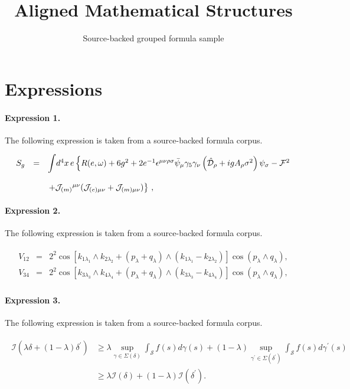 \documentclass[11pt]{article}
\title{Aligned Mathematical Structures}
\author{Source-backed grouped formula sample}
\date{}
\begin{document}
\maketitle
\section{Expressions}
\paragraph{Expression 1.} The following expression is taken from a source-backed formula corpus.

\begin{align*}\begin{array}{rcl}S_{g} & = & {\displaystyle\int} d^{4}x\, e \left\{ R(e,\omega) +6g^{2}+2 e^{-1}\epsilon^{\mu\nu\rho\sigma}\bar{\psi}_{\mu}\gamma_{5}\gamma_{\nu}\left(\hat{\cal D}_{\rho}+ig A_{\rho}\sigma^{2}\right)\psi_{\sigma}-{\cal F}^{2} \right.\\& & \\& & \left. +{\cal J}_{(m)}{}^{\mu\nu}({\cal J}_{(e) \mu\nu} +{\cal J}_{(m) \mu\nu}) \right\}\, ,\end{array}\end{align*}

\paragraph{Expression 2.} The following expression is taken from a source-backed formula corpus.

\begin{align*}\begin{array}{rcl}V_{12}&=&\displaystyle 2^2\cos[k_{1\lambda_1}\wedge k_{2\lambda_2}+(p_{\lambda}+q_{\lambda})\wedge(k_{1\lambda_1}-k_{2\lambda_2})]\cos(p_{\lambda}\wedge q_{\lambda}), \\V_{34}&=&\displaystyle 2^2\cos[k_{3\lambda_3}\wedge k_{4\lambda_4}+(p_{\lambda}+q_{\lambda})\wedge(k_{3\lambda_3}-k_{4\lambda_4})]\cos(p_{\lambda}\wedge q_{\lambda}), \end{array}\end{align*}

\paragraph{Expression 3.} The following expression is taken from a source-backed formula corpus.

\begin{align*}\begin{aligned}\mathcal{I}\left(\lambda \delta + (1-\lambda) \delta^\prime \right) &\geq \lambda \sup_{\gamma \in \Sigma(\delta)} \int_{\mathcal{S} } f(s) d \gamma(s) + (1-\lambda) \sup_{\gamma^\prime \in \Sigma(\delta^\prime)}\int_{\mathcal{S} } f(s) d \gamma^{\prime }(s) \\& \geq \lambda \mathcal{I}(\delta) +(1-\lambda) \mathcal{I}(\delta^\prime).\end{aligned}\end{align*}
\end{document}
